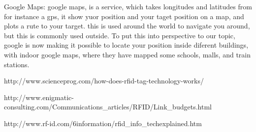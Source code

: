 

Google Maps:
google maps, is a service, which takes longitudes and latitudes from for instance a gps, it show yuor position and your taget position on a map, and plots a rute to your target. this is used around the world to navigate you around, but this is commonly used outside. To put this into perspective to our topic, google is now making it possible to locate your position inside diferent buildings, with indoor google maps, where they have mapped some schools, malls, and train stations. 


http://www.scienceprog.com/how-does-rfid-tag-technology-works/

http://www.enigmatic-consulting.com/Communications_articles/RFID/Link_budgets.html

http://www.rf-id.com/6information/rfid_info_techexplained.htm


